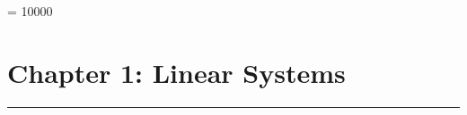 \documentclass[11pt]{article}
\begin{document}
\newcommand{\defn}[1]{%
\begin{definitionBox}{}{}
#1
\end{definitionBox}%
\vspace{0.1cm}
}
\newcommand{\theo}[1]{%
\begin{theoremBox}{}{} 
#1
\end{theoremBox}%
\vspace{0.1cm}
}
\newcommand{\corr}[1]{%
\begin{corollaryBox}{}{}
#1
\end{corollaryBox}%
\vspace{0.1cm}
}
\newcommand{\algo}[2]{%
\begin{algorithmBox}{#1}{}
#2
\end{algorithmBox}%
\vspace{0.1cm}
}
\newcommand{\props}[2]{%
\begin{propertiesBox}{#1}{}
#2
\end{propertiesBox}%
\vspace{0.1cm}
}
\newcommand{\lemma}[1]{%
\begin{lemmaBox}{}{}
#1
\end{lemmaBox}%
\vspace{0.1cm}
}
\newcommand{\sectiontitle}[1]{%
\begin{flushleft}\large{\textbf{#1}}\end{flushleft}} 
\newcommand{\chapter}[1]{%
\newpage
\section*{#1}
\hrule
\vspace{0.3cm}
}


\setcounter{MaxMatrixCols}{20}

\hbadness = 10000

\chapter{Chapter 1: Linear Systems}
\end{document}
